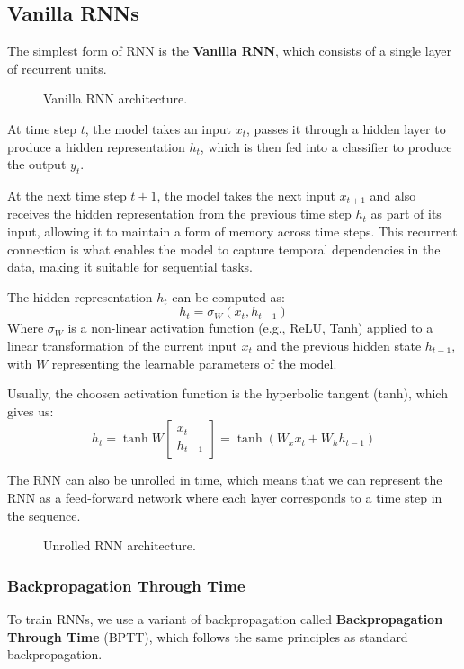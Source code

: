 \subsection{Vanilla RNNs}
The simplest form of RNN is the \textbf{Vanilla RNN}, which consists of a single layer of recurrent units.
\begin{figure}[H]
    \centering
    
    \caption{Vanilla RNN architecture.}
\end{figure}

At time step $t$, the model takes an input $x_t$, passes it through a hidden layer to produce a hidden representation $h_t$, 
which is then fed into a classifier to produce the output $y_t$.

At the next time step $t+1$, the model takes the next input $x_{t+1}$ and also receives the hidden representation from the previous time step $h_t$ as part of its input,
allowing it to maintain a form of memory across time steps.
This recurrent connection is what enables the model to capture temporal dependencies in the data, making it suitable for sequential tasks.

The hidden representation $h_t$ can be computed as:
\begin{equation}
    h_t = \sigma_{W}(x_t, h_{t-1})
\end{equation}
Where $\sigma_{W}$ is a non-linear activation function (e.g., ReLU, Tanh) applied to a linear transformation of the current input $x_t$ and the previous hidden state $h_{t-1}$,
with $W$ representing the learnable parameters of the model.

Usually, the choosen activation function is the hyperbolic tangent (tanh), which gives us:
\begin{equation*}
    h_t = \tanh W \begin{bmatrix}
        x_t \\
        h_{t-1}
    \end{bmatrix}
    = \tanh (W_x x_t + W_h h_{t-1})
\end{equation*}

The RNN can also be unrolled in time, which means that we can represent the RNN as a feed-forward network where each layer corresponds to a time step in the sequence.
\begin{figure}
    \centering
    \scalebox{0.8}{
        
    }
    \caption{Unrolled RNN architecture.}
\end{figure}
\subsubsection{Backpropagation Through Time}
To train RNNs, we use a variant of backpropagation called \textbf{Backpropagation Through Time} (BPTT), 
which follows the same principles as standard backpropagation.

